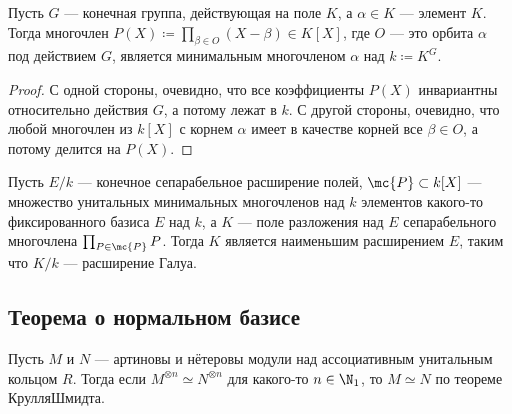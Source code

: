 \documentclass[
	extrafontsizes,
	11pt,
	hyphens,
]{memoir}
\begin{document}
\begin{theorem}
Пусть \(G\) --- конечная группа, действующая на поле \(K\), а \(\alpha \in K\) --- элемент \(K\).
Тогда многочлен \(P(X) \coloneqq \prod_{\beta \in O} (X - \beta) \in K[X]\), где \(O\) --- это орбита \(\alpha\) под действием \(G\), является минимальным многочленом \(\alpha\) над \(k \coloneqq K^G\).
\end{theorem}

\begin{proof}
С одной стороны, очевидно, что все коэффициенты \(P(X)\) инвариантны относительно действия \(G\), а потому лежат в \(k\). С другой стороны, очевидно, что
любой многочлен из \(k[X]\) с корнем \(\alpha\) имеет в качестве корней все \(\beta \in O\), а потому делится на \(P(X)\).
\end{proof}

%

\begin{observation}
Пусть \(E/k\) --- конечное сепарабельное расширение полей, \(\mc{P} \subset k[X]\) --- множество унитальных минимальных многочленов над \(k\) элементов какого-то фиксированного базиса \(E\) над \(k\),
а \(K\) --- поле разложения над \(E\) сепарабельного многочлена \(\prod_{P \in \mc{P}} P\).
Тогда \(K\) является наименьшим расширением \(E\), таким что \(K/k\) --- расширение Галуа.
\end{observation}

\subsection{Теорема о нормальном базисе}

\begin{observation}
Пусть \(M\) и \(N\) --- артиновы и нётеровы модули над ассоциативным унитальным кольцом \(R\).
\label{obs:KrullSchCansel}
Тогда если \(M^{\otimes n} \simeq N^{\otimes n}\) для какого-то \(n \in \N_1\), то \(M \simeq N\) по теореме Крулля\namedash{}Шмидта.
\end{observation}
\end{document}
